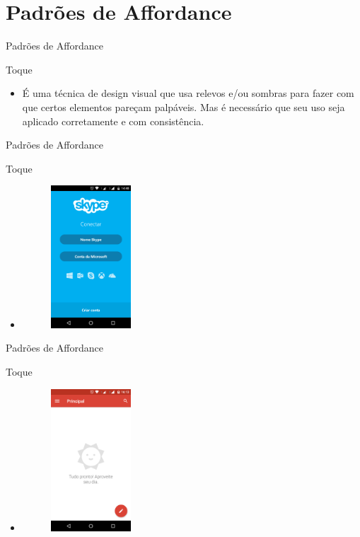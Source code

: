 \section{Padrões de Affordance}

\begin{frame}{Padrões de Affordance}
\begin{block}{Toque}
  \begin{itemize}
    \item<1-> É uma técnica de design visual que usa relevos e/ou sombras para fazer com que certos elementos pareçam palpáveis. Mas é necessário que seu uso seja aplicado corretamente e com consistência.
  \end{itemize}
\end{block}
\end{frame}

\begin{frame}{Padrões de Affordance}
\begin{block}{Toque}
  \begin{itemize}
    \item<1-> \begin{figure}
    \includegraphics[width=3cm]{figuras/touch/tocar}
    \end{figure}
  \end{itemize}
\end{block}
\end{frame}

\begin{frame}{Padrões de Affordance}
\begin{block}{Toque}
  \begin{itemize}
    \item<1-> \begin{figure}
    \includegraphics[width=3cm]{figuras/touch/tocar2}
    \end{figure}
  \end{itemize}
\end{block}
\end{frame}

